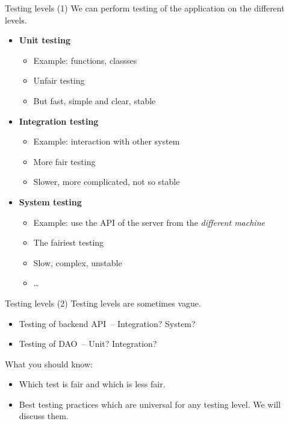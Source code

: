 \documentclass[aspectratio=169]{beamer}
\begin{document}
\begin{frame}{Testing levels (1)}
  We can perform testing of the application on the different levels.
  \begin{itemize}
    \item \textbf{Unit testing}
      \begin{itemize}
        \item Example: functions, classses
        \item Unfair testing
        \item But fast, simple and clear, stable
      \end{itemize}
    \pause
    \item \textbf{Integration testing}
      \begin{itemize}
        \item Example: interaction with other system
        \item More fair testing
        \item Slower, more complicated, not so stable
      \end{itemize}
    \pause
    \item \textbf{System testing}
      \begin{itemize}
        \item Example: use the API of the server from the \textit{different machine}
        \item The fairiest testing
        \item Slow, complex, unstable
        \item \ldots
      \end{itemize}
  \end{itemize}
\end{frame}

\begin{frame}{Testing levels (2)}
  Testing levels are sometimes vague.
  \begin{itemize}
    \item Testing of backend API~-- Integration? System?
    \item Testing of DAO~-- Unit? Integration?
  \end{itemize}
  \pause
  \bigskip
  What you should know:
  \begin{itemize}
    \item Which test is fair and which is less fair.
    \item Best testing practices which are universal for any testing level.
          We will discuss them.
  \end{itemize}
\end{frame}
\end{document}
